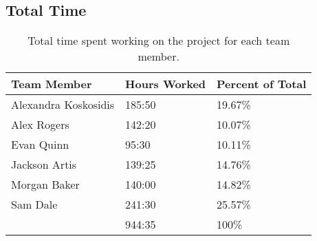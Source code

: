 \clearpage

\subsection{Total Time}

\begin{table}[htv]
\centering
\begin{tabular}{l|l|l|}
\hline
\multicolumn{1}{|l|}{\textbf{Team Member}} & \textbf{Hours Worked} & \textbf{Percent of Total} \\ \hline
\multicolumn{1}{|l|}{Alexandra Koskosidis} & 185:50 & 19.67\% \\ \hline
\multicolumn{1}{|l|}{Alex Rogers} & 142:20 & 10.07\% \\ \hline
\multicolumn{1}{|l|}{Evan Quinn} & 95:30 & 10.11\% \\ \hline
\multicolumn{1}{|l|}{Jackson Artis} & 139:25 & 14.76\% \\ \hline
\multicolumn{1}{|l|}{Morgan Baker} & 140:00 & 14.82\% \\ \hline
\multicolumn{1}{|l|}{Sam Dale} & 241:30 & 25.57\% \\ \hline
 & 944:35 & 100\% \\ \cline{2-3} 
\end{tabular}
\caption{Total time spent working on the project for each team member.}
\end{table}


\clearpage
